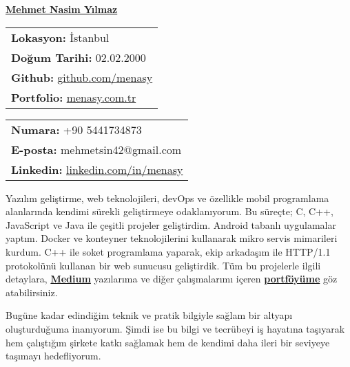\documentclass[a4paper,11pt]{article}
\begin{document}
\vspace*{-6.5em} 
\begin{center}
    \href{https://menasy.com.tr/}{\LARGE \textbf{Mehmet Nasim Yılmaz}}
\end{center}
\vspace*{0.5em} 
\noindent
\begin{minipage}[t]{0.48\textwidth}
    \begin{tabular}{@{}l}
        \textbf{Lokasyon:} İstanbul \\
        \textbf{Doğum Tarihi:} 02.02.2000 \\
        \textbf{Github:} \href{https://github.com/menasy}{github.com/menasy} \\
        \textbf{Portfolio:} \href{https://menasy.com.tr/}{menasy.com.tr} \\
    \end{tabular}
\end{minipage}%
\hfill
\begin{minipage}[t]{0.48\textwidth}
    \raggedleft
    \begin{tabular}{@{}l}
        \textbf{Numara:} +90 5441734873 \\
        \textbf{E-posta:} mehmetsin42@gmail.com \\
        \textbf{Linkedin:} \href{https://linkedin.com/in/menasy}{linkedin.com/in/menasy} \\
    \end{tabular}
\end{minipage}

\vspace{0.7em}

Yazılım geliştirme, web teknolojileri, devOps ve özellikle mobil programlama alanlarında kendimi sürekli geliştirmeye odaklanıyorum. Bu süreçte; C, C++, JavaScript ve Java ile çeşitli projeler geliştirdim. Android tabanlı uygulamalar yaptım. Docker ve konteyner teknolojilerini kullanarak mikro servis mimarileri kurdum. C++ ile soket programlama yaparak, ekip arkadaşım ile HTTP/1.1 protokolünü kullanan bir web sunucusu geliştirdik. Tüm bu projelerle ilgili detaylara, \textbf{\href{https://medium.com/@menasy}{Medium}} yazılarıma ve diğer çalışmalarımı içeren \textbf{\href{https://menasy.com.tr/}{portföyüme}} göz atabilirsiniz.
\vspace{-0.5em}

Bugüne kadar edindiğim teknik ve pratik bilgiyle sağlam bir altyapı oluşturduğuma inanıyorum. Şimdi ise bu bilgi ve tecrübeyi iş hayatına taşıyarak hem çalıştığım şirkete katkı sağlamak hem de kendimi daha ileri bir seviyeye taşımayı hedefliyorum.
\vspace{-0.5em}
\end{document}
